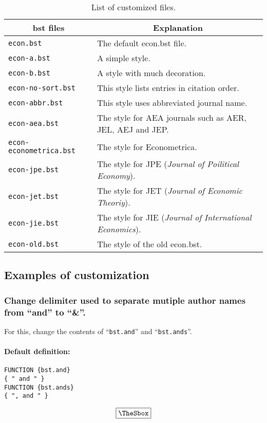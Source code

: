 \documentclass[10pt]{article}
\newenvironment{Frame}%
{\setlength{\fboxsep}{15pt}
\setlength{\mylength}{\linewidth}%
\addtolength{\mylength}{-2\fboxsep}%
\addtolength{\mylength}{-2\fboxrule}%
\Sbox
\minipage{\mylength}%
\setlength{\abovedisplayskip}{0pt}%
\setlength{\belowdisplayskip}{0pt}%
}%
{\endminipage\endSbox
\[\fbox{\TheSbox}\]}
\begin{document}
\begin{table}[htbp]
\begin{flushleft}
\caption{List of customized files.}
\label{tab:c-files} 
\begin{tabular}{l|l} \hline \hline
\multicolumn{1}{c}{bst files} & \multicolumn{1}{c}{Explanation} \\\hline
\texttt{econ.bst}              & The default econ.bst file. \\\hline
\texttt{econ-a.bst}            & A simple style. \\\hline
\texttt{econ-b.bst}            & A style with much decoration. \\\hline
\texttt{econ-no-sort.bst}      & This style lists entries in citation order. \\\hline
\texttt{econ-abbr.bst}         & This style uses abbreviated journal name. \\\hline
\texttt{econ-aea.bst}          & The style for AEA journals such as AER, JEL, AEJ and JEP. \\\hline
\texttt{econ-econometrica.bst} & The style for Econometrica. \\\hline
\texttt{econ-jpe.bst}          & The style for JPE (\textit{Journal of Poilitical Economy}). \\\hline
\texttt{econ-jet.bst}          & The style for JET (\textit{Journal of Economic Theoriy}). \\\hline
\texttt{econ-jie.bst}          & The style for JIE (\textit{Journal of International Economics}). \\\hline
\texttt{econ-old.bst}          & The style of the old econ.bst. \\\hline
\end{tabular}
\end{flushleft}
\end{table}

\subsection{Examples of customization}

\subsubsection{Change delimiter used to separate mutiple author names
   from ``and'' to ``\&''.}

For this, change the contents of ``\texttt{bst.and}'' and ``\texttt{bst.ands}''.
\paragraph{Default definition:}
\begin{Frame}
\begin{verbatim}
FUNCTION {bst.and}
{ " and " }
FUNCTION {bst.ands}
{ ", and " }
\end{verbatim}
\end{Frame}
\end{document}
